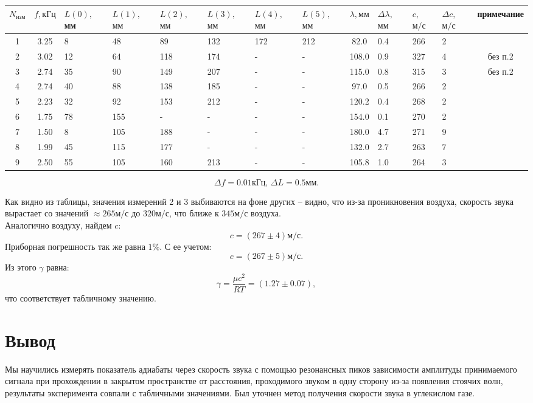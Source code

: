 \begin{center}
\begin{tabular}{|c|c|m{0.8cm}|m{0.8cm}|m{0.8cm}|m{0.8cm}|m{0.8cm}|m{0.8cm}|c|m{0.7cm}|m{0.6cm}|m{0.6cm}|c|}
\hline $N_\text{изм}$&$f, \text{кГц}$&$L(0),$ мм&$L(1),$ $\text{мм}$&$L(2),$ $\text{мм}$&$L(3),$ $\text{мм}$&$L(4),$ $\text{мм}$&$L(5),$ $\text{мм}$&$\lambda, \text{мм}$&$\Delta \lambda,$ $\text{мм}$&$c,$ $\text{м}/\text{с}$&$\Delta c,$ $\text{м}/\text{с}$&примечание\\\hline
1&3.25&8&48&89&132&172&212&82.0&0.4&266&2&\\ \hline
2&3.02&12&64&118&174&-&-&108.0&0.9&327&4&без п.2\\ \hline
3&2.74&35&90&149&207&-&-&115.0&0.8&315&3&без п.2\\ \hline
4&2.74&40&88&138&185&-&-&97.0&0.5&266&2&\\ \hline
5&2.23&32&92&153&212&-&-&120.2&0.4&268&2&\\ \hline
6&1.75&78&155&-&-&-&-&154.0&0.1&270&2&\\ \hline
7&1.50&8&105&188&-&-&-&180.0&4.7&271&9&\\ \hline
8&1.99&45&115&177&-&-&-&132.0&2.7&263&7&\\ \hline
9&2.50&55&105&160&213&-&-&105.8&1.0&264&3&\\ \hline
\end{tabular}
$$\Delta f = 0.01\text{кГц},\,\Delta L = 0.5\text{мм}.$$
\end{center}
Как видно из таблицы, значения измерений 2 и 3 выбиваются на фоне других -- видно, что из-за проникновения воздуха, скорость звука вырастает со значений $\approx 265 \text{м}/\text{с}$ до $320\text{м}/\text{с}$, что ближе к $345\text{м}/\text{с}$ воздуха.\\
Аналогично воздуху, найдем $c$:
$$c = (267\pm4)\text{м}/\text{с}.$$
Приборная погрешность так же равна $1\%$. С ее учетом:
$$c = (267\pm5)\text{м}/\text{с}.$$
Из этого $\gamma$ равна:
$$\gamma = \frac{\mu c^2}{RT} = (1.27\pm0.07),$$
что соответствует табличному значению.

\section*{Вывод}
Мы научились измерять показатель адиабаты через скорость звука с помощью резонансных пиков зависимости амплитуды принимаемого сигнала при прохождении в закрытом пространстве от расстояния, проходимого звуком в одну сторону из-за появления стоячих волн, результаты эксперимента совпали с табличными значениями. Был уточнен метод получения скорости звука в углекислом газе.









